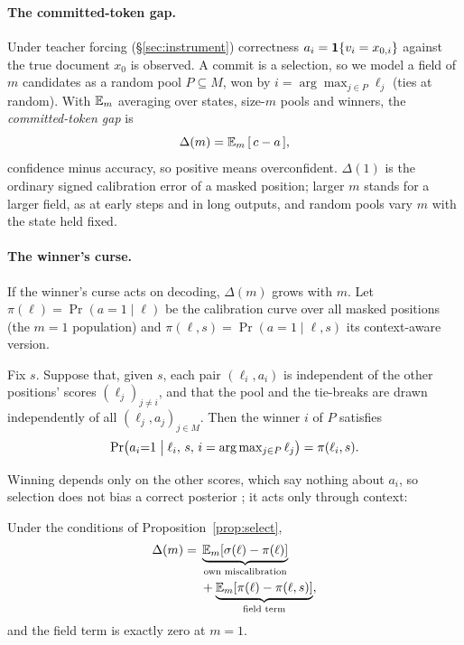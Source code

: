 \paragraph{The committed-token gap.}
Under teacher forcing (\S\ref{sec:instrument}) correctness $a_i=\mathbf{1}\{v_i=x_{0,i}\}$ against the
true document $x_0$ is observed. A commit is a selection, so we model a field of $m$ candidates
as a random pool $P\subseteq M$, won by $i=\arg\max_{j\in P}\ell_j$ (ties at random).
With $\mathbb{E}_m$ averaging over states, size-$m$ pools and winners, the
\emph{committed-token gap} is
\begin{equation}
  \Delta(m) = \mathbb{E}_m\,[\,c - a\,],
  \label{eq:gap}
\end{equation}
confidence minus accuracy, so positive means overconfident. $\Delta(1)$ is the ordinary signed calibration error of a masked
position; larger $m$ stands for a larger field, as at early steps and in long outputs, and random pools
vary $m$ with the state held fixed.

\paragraph{The winner's curse.}
If the winner's curse acts on decoding, $\Delta(m)$ grows with $m$. Let $\pi(\ell)=\Pr(a=1\mid\ell)$ be the calibration curve over all masked positions (the
$m=1$ population) and $\pi(\ell,s)=\Pr(a=1\mid\ell,s)$ its context-aware version.

\begin{proposition}
\label{prop:select}
Fix $s$. Suppose that, given $s$, each pair $(\ell_i,a_i)$ is independent of the other
positions' scores $(\ell_j)_{j\neq i}$, and that the pool and the tie-breaks are drawn
independently of all $(\ell_j,a_j)_{j\in M}$. Then the winner $i$ of $P$ satisfies
\[
  \Pr\bigl(a_i{=}1 \bigm| \ell_i,\, s,\, i=\arg\max\nolimits_{j\in P}\ell_j\bigr)=\pi(\ell_i,s).
\]
\end{proposition}

Winning depends only on the other scores, which say nothing about $a_i$, so selection does not
bias a correct posterior \citep{dawid1994selection,efron2011tweedie}; it acts
only through context:

\begin{proposition}
\label{prop:split}
Under the conditions of Proposition~\ref{prop:select},
\begin{equation}
  \begin{split}
  \Delta(m) = {} & \underbrace{\mathbb{E}_m[\sigma(\ell)-\pi(\ell)]}_{\text{own miscalibration}} \\
            & + \underbrace{\mathbb{E}_m[\pi(\ell)-\pi(\ell,s)]}_{\text{field term}} ,
  \end{split}
  \label{eq:gapsplit}
\end{equation}
and the field term is exactly zero at $m=1$.
\end{proposition}

